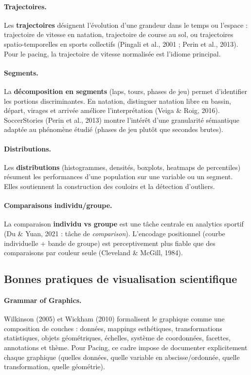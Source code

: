 \documentclass[11pt,a4paper]{article}
\begin{document}
\paragraph{Trajectoires.}
Les \textbf{trajectoires} désignent l'évolution d'une grandeur dans le temps ou l'espace : trajectoire de vitesse en natation, trajectoire de course au sol, ou trajectoires spatio-temporelles en sports collectifs (Pingali et al., 2001 ; Perin et al., 2013). Pour le pacing, la trajectoire de vitesse normalisée est l'idiome principal.

\paragraph{Segments.}
La \textbf{décomposition en segments} (laps, tours, phases de jeu) permet d'identifier les portions discriminantes. En natation, distinguer natation libre en bassin, départ, virages et arrivée améliore l'interprétation (Veiga \& Roig, 2016). SoccerStories (Perin et al., 2013) montre l'intérêt d'une granularité sémantique adaptée au phénomène étudié (phases de jeu plutôt que secondes brutes).

\paragraph{Distributions.}
Les \textbf{distributions} (histogrammes, densités, boxplots, heatmaps de percentiles) résument les performances d'une population sur une variable ou un segment. Elles soutiennent la construction des couloirs et la détection d'outliers.

\paragraph{Comparaisons individu/groupe.}
La comparaison \textbf{individu vs groupe} est une tâche centrale en analytics sportif (Du \& Yuan, 2021 : tâche de \textit{comparison}). L'encodage positionnel (courbe individuelle + bande de groupe) est perceptivement plus fiable que des comparaisons par couleur seule (Cleveland \& McGill, 1984).

\subsection{Bonnes pratiques de visualisation scientifique}

\paragraph{Grammar of Graphics.}
Wilkinson (2005) et Wickham (2010) formalisent le graphique comme une composition de couches : données, mappings esthétiques, transformations statistiques, objets géométriques, échelles, système de coordonnées, facettes, annotations et thème. Pour Pacing, ce cadre impose de documenter explicitement chaque graphique (quelles données, quelle variable en abscisse/ordonnée, quelle transformation, quelle géométrie).
\end{document}
